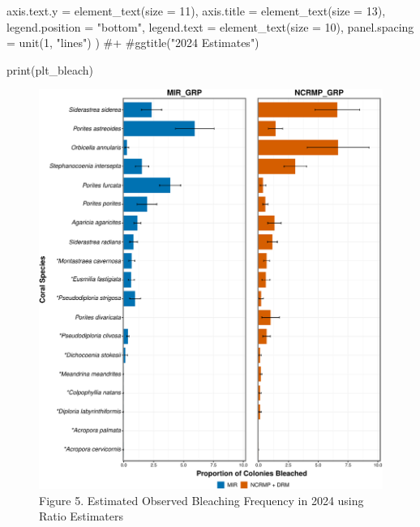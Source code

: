 \documentclass[
]{article}
\newenvironment{Shaded}{\begin{snugshade}}{\end{snugshade}}
\newcommand{\AttributeTok}[1]{\textcolor[rgb]{0.40,0.45,0.13}{#1}}
\newcommand{\CommentTok}[1]{\textcolor[rgb]{0.37,0.37,0.37}{#1}}
\newcommand{\DecValTok}[1]{\textcolor[rgb]{0.68,0.00,0.00}{#1}}
\newcommand{\FunctionTok}[1]{\textcolor[rgb]{0.28,0.35,0.67}{#1}}
\newcommand{\NormalTok}[1]{\textcolor[rgb]{0.00,0.23,0.31}{#1}}
\newcommand{\StringTok}[1]{\textcolor[rgb]{0.13,0.47,0.30}{#1}}
\begin{document}
\begin{Shaded}
\begin{Highlighting}[]
          \AttributeTok{axis.text.y =} \FunctionTok{element\_text}\NormalTok{(}\AttributeTok{size =} \DecValTok{11}\NormalTok{),}
          \AttributeTok{axis.title =} \FunctionTok{element\_text}\NormalTok{(}\AttributeTok{size =} \DecValTok{13}\NormalTok{),}
          \AttributeTok{legend.position =} \StringTok{"bottom"}\NormalTok{,}
          \AttributeTok{legend.text =} \FunctionTok{element\_text}\NormalTok{(}\AttributeTok{size =} \DecValTok{10}\NormalTok{),}
          \AttributeTok{panel.spacing =} \FunctionTok{unit}\NormalTok{(}\DecValTok{1}\NormalTok{, }\StringTok{"lines"}\NormalTok{)}
\NormalTok{        ) }\CommentTok{\#+}
  \CommentTok{\#ggtitle("2024 Estimates")}


\FunctionTok{print}\NormalTok{(plt\_bleach)}
\end{Highlighting}
\end{Shaded}

\begin{figure}[H]

{\centering \includegraphics{MIR_quarto_files/figure-pdf/bleach 2024-1.pdf}

}

\caption{Figure 5. Estimated Observed Bleaching Frequency in 2024 using
Ratio Estimaters}

\end{figure}
\end{document}
